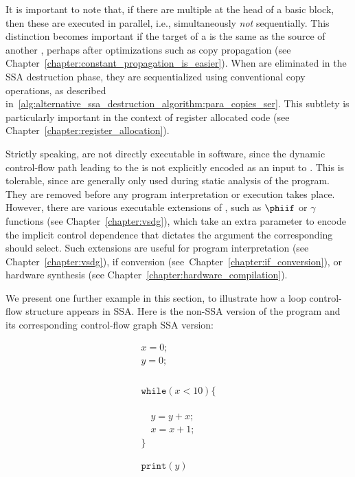It is important to note that, if there are multiple \phifuns{} at the head of a basic block, then these are executed in parallel, i.e., simultaneously \textit{not} sequentially. 
This distinction becomes important if the target of a \phifun is the same as the source of another \phifun, perhaps after optimizations such as copy propagation (see Chapter~\ref{chapter:constant_propagation_is_easier}). 
When \phifuns are eliminated in the SSA destruction phase, they are sequentialized using conventional copy operations, as described in~\ref{alg:alternative_ssa_destruction_algorithm:para_copies_ser}. 
This subtlety is particularly important in the context of register allocated code (see Chapter~\ref{chapter:register_allocation}).

Strictly speaking, \phifuns are not directly executable in software, since the dynamic control-flow path leading to the \phifun is not explicitly encoded as an input to \phifun. 
This is tolerable, since \phifuns are generally only used during static analysis of the program. 
They are removed before any program interpretation or execution takes place. 
However, there are various executable extensions of \phifuns, such as $\phiif$ or $\gamma$ functions (see Chapter~\ref{chapter:vsdg}), which take an extra parameter to encode the implicit control dependence that dictates the argument the corresponding \phifun should select. %
Such extensions are useful for program interpretation (see Chapter~\ref{chapter:vsdg}), if conversion (see~Chapter~\ref{chapter:if_conversion}), or hardware synthesis (see Chapter~\ref{chapter:hardware_compilation}).

We present one further example in this section, to illustrate how a loop control-flow structure appears in SSA. 
Here is the non-SSA version of the program and its corresponding control-flow graph SSA version:
\medskip

\begin{minipage}{0.5\textwidth}
\begin{equation*}
\begin{array}{l}
x = 0;\\
y = 0;\\
~\\\\\\\\
\texttt{while} (x < 10) \{\\
~\\\\\\
\quad  y = y + x;\\
\quad  x = x + 1;\\
\}\\
~\\\\
\texttt{print}(y)
\end{array} 
\end{equation*}
\end{minipage}
\begin{minipage}{0.4\textwidth}
\end{minipage}
\bigskip

